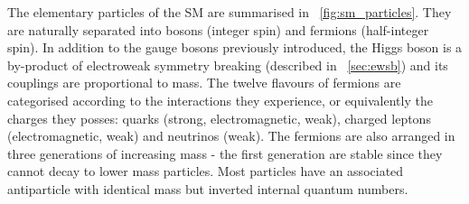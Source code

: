 The elementary particles of the \ac{SM} are summarised in \Figure~\ref{fig:sm_particles}.
They are naturally separated into bosons (integer spin) and fermions (half-integer spin).
In addition to the gauge bosons previously introduced, the Higgs boson is a by-product
of electroweak symmetry breaking (described in \Section~\ref{sec:ewsb}) and its
couplings are proportional to mass. The twelve flavours of fermions are categorised 
according to the interactions they experience, or equivalently the charges they posses: 
quarks (strong, electromagnetic, weak), charged leptons (electromagnetic, weak) and 
neutrinos (weak). The fermions are also arranged in three generations of increasing
mass - the first generation are stable since they cannot decay to lower mass particles.
Most particles have an associated antiparticle with identical mass but inverted internal 
quantum numbers.
